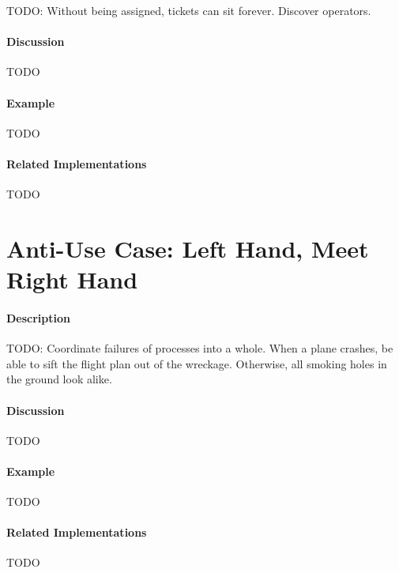{\Large TODO:} Without being assigned, tickets can sit forever. Discover operators.

\paragraph{Discussion}

{\Large TODO}

\paragraph{Example}

{\Large TODO}

\paragraph{Related Implementations}

{\Large TODO}

\section{Anti-Use Case: Left Hand, Meet Right Hand}

\paragraph{Description}

{\Large TODO:} Coordinate failures of processes into a whole. When a plane crashes, be able to sift the flight plan out of the wreckage. Otherwise, all smoking holes in the ground look alike.

\paragraph{Discussion}

{\Large TODO}

\paragraph{Example}

{\Large TODO}

\paragraph{Related Implementations}

{\Large TODO}
